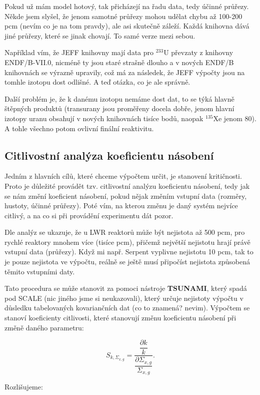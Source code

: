 Pokud už mám model hotový, tak přicházejí na řadu data, tedy účinné průřezy. Někde jsem slyšel, že jenom samotné průřezy mohou udělat chybu až 100-200 pcm (nevím co je na tom pravdy), ale asi skutečně záleží. Každá knihovna dává jiné průřezy, které se jinak chovají. To samé verze mezi sebou.

Například vím, že JEFF knihovny mají data pro $^{233}$U převzaty z knihovny ENDF/B-VII.0, nicméně ty jsou staré strašně dlouho a v nových ENDF/B knihovnách se výrazně upravily, což má za následek, že JEFF výpočty jsou na tomhle izotopu dost odlišné. A teď otázka, co je ale správně. 

Další problém je, že k danému izotopu nemáme dost dat, to se týká hlavně štěpných produktů (transurany jsou proměřeny docela dobře, jenom hlavní izotopy uranu obsahují v nových knihovnách tisíce bodů, naopak $^{135}$Xe jenom 80). A tohle všechno potom ovlivní finální reaktivitu.

\subsection{Citlivostní analýza koeficientu násobení}

Jedním z hlavních cílů, které chceme výpočtem určit, je stanovení kritičnosti. Proto je důležité provádět tzv. citlivostní analýzu koeficientu násobení, tedy jak se nám změní koeficient násobení, pokud nějak změním vstupní data (rozměry, hustoty, účinné průřezy). Poté vím, na kterou změnu je daný systém nejvíce citlivý, a na co si při provádění experimentu dát pozor.

Dle analýz se ukazuje, že u LWR reaktorů může být nejistota až 500 pcm, pro rychlé reaktory mnohem více (tisíce pcm), přičemž největší nejistotu hrají právě vstupní data (průřezy). Když mi např. Serpent vyplivne nejistotu 10 pcm, tak to je pouze nejistota ve výpočtu, reálně se ještě musí připočíst nejistota způsobená těmito vstupními daty.

Tato procedura se může stanovit za pomoci nástroje \textbf{TSUNAMI}, který spadá pod SCALE (nic jiného jsme si neukazovali), který určuje nejistoty výpočtu v důsledku tabelovaných kovariančních dat (co to znamená? nevim). Výpočtem se stanoví koeficienty citlivosti, které stanovují změnu koeficientu násobení při změně daného parametru:

$$ S_{k,\Sigma_{x,g}} = \dfrac{\dfrac{\partial k}{k}}{\dfrac{\partial \Sigma_{x,g}}{\Sigma_{x,g}}}. $$

Rozlišujeme:

